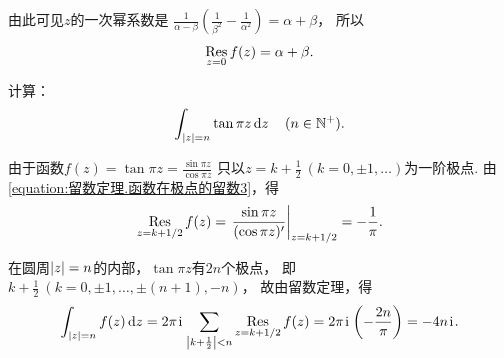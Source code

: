 \begin{example}
\begin{solution}
由此可见\(z\)的一次幂系数是
\(\frac{1}{\alpha-\beta} \left(\frac{1}{\beta^2}-\frac{1}{\alpha^2}\right)
= \alpha+\beta\)，
所以\begin{equation*}
	\operatorname*{Res}_{z=0} f(z) = \alpha+\beta.
\end{equation*}
\end{solution}
\end{example}

\begin{example}
计算：\begin{equation*}
	\int_{\abs{z}=n} \tan \pi z \dd{z}
	\quad(n\in\mathbb{N}^+).
\end{equation*}
\begin{solution}
由于函数\(f(z) = \tan \pi z = \frac{\sin \pi z}{\cos \pi z}\)
只以\(z=k+\frac{1}{2}\ (k=0,\pm1,\dotsc)\)为一阶极点.
由\cref{equation:留数定理.函数在极点的留数3}，得\begin{equation*}
	\Res_{z=k+1/2} f(z)
	= \eval{\frac{\sin \pi z}{(\cos \pi z)'}}_{z=k+1/2}
	= -\frac{1}{\pi}.
\end{equation*}

在圆周\(\abs{z}=n\)的内部，\(\tan \pi z\)有\(2n\)个极点，
即\(k + \frac{1}{2}\ (k=0,\pm1,\dotsc,\pm(n+1),-n)\)，
故由留数定理，得\begin{equation*}
	\int_{\abs{z}=n} f(z) \dd{z}
	= 2\pi\kern1pt\mathrm{i}\kern1pt \sum_{\abs{k+\frac{1}{2}}<n} \operatorname*{Res}_{z=k+1/2} f(z)
	= 2\pi\kern1pt\mathrm{i}\kern1pt \left(-\frac{2n}{\pi}\right)
	= -4n\kern1pt\mathrm{i}\kern1pt.
\end{equation*}
\end{solution}
\end{example}
